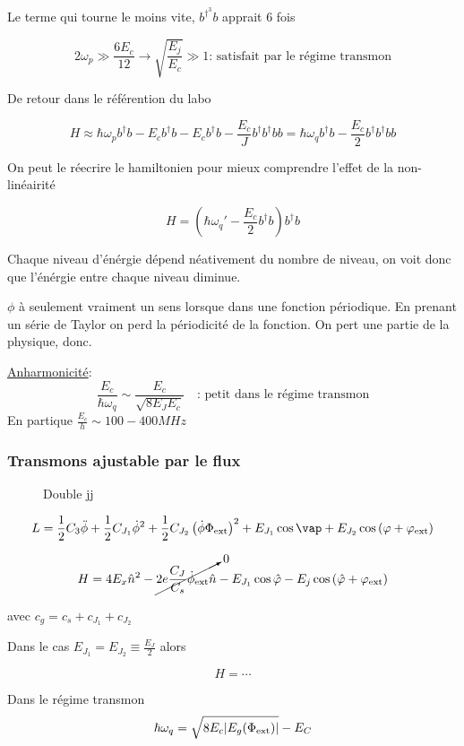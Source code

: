 Le terme qui tourne le moins vite, $b^{\dagger}^3b$ apprait $6$ fois

\[ 2 \omega_p \gg \frac{6E_{c}}{12} \to \sqrt{\frac{E_j}{E_c} } \gg 1 \text{: satisfait par le régime transmon} \]

De retour dans le référention du labo

\[ H \approx \hbar \omega_p b^{\dagger}b - E_c b^{\dagger} b - E_c b^{\dagger} b - \frac{E_c}{J} b^{\dagger} b^{\dagger} b b = \hbar \omega_q b^{\dagger} b - \frac{E_c}{2} b^{\dagger} b^{\dagger} bb \]

On peut le réecrire le hamiltonien pour mieux comprendre l'effet de la non-linéairité

\[ H = \left( \hbar\omega_q' - \frac{E_c}{2} b^{\dagger} b \right) b^{\dagger} b \]

Chaque niveau d'énérgie dépend néativement du nombre de niveau, on voit donc que l'énérgie entre chaque niveau diminue.


\begin{tcolorbox}[title=Remarque sur $\hat phi$]
     $\phi$ à seulement vraiment un sens lorsque dans une fonction périodique. En prenant un série de Taylor on perd la périodicité de la fonction. On pert une partie de la physique, donc. 

     \underline{Anharmonicité}: \[ \frac{E_{c}}{\hbar\omega_{q}} \sim \frac{E_c}{\sqrt{8E_J E_c }} \quad \text{: petit dans le régime transmon}    \]
     En partique $  \frac{E_c}{h} \sim 100 - 400 MHz$
\end{tcolorbox}



\subsubsection{Transmons ajustable par le flux}

\begin{figure}[ht]
    \centering
    \caption{Double jj}
    \label{fig:double-jj}
\end{figure}

\[ L = \frac{1}{2} C_3 \ddot \phi + \frac{1}{2} C_{J_1} \dot \phi^{2}+ \frac{1}{2} C_{J_2} \left( \dot \phi \do \Phi_{\text{ext}}  \right)^2 + E_{J_1} \cos \vap + E_{J_2} \cos \left( \varphi + \varphi_{\text{ext}}  \right) \]

\[ H = 4 E_x \hat n^{2}- \cancelto{0}{2 e \frac{C_J}{C_s} \dot \phi_{\text{ext}} \hat n} - E_{J_1} \cos \hat \varphi - E_j \cos \left( \hat \varphi + \varphi_{\text{ext}}  \right)  \]

avec $c_g = c_s + c_{J_1} + c_{J_2} $

Dans le cas $   E_{J_1} = E_{J_2} \equiv \frac{E_J}{2} $ alors


\[  H = \dotsb \]


Dans le régime transmon \[ \hbar\omega_q = \sqrt{8E_c \abs{E_g (\Phi_{\text{ext}} )} } -E_C\]


